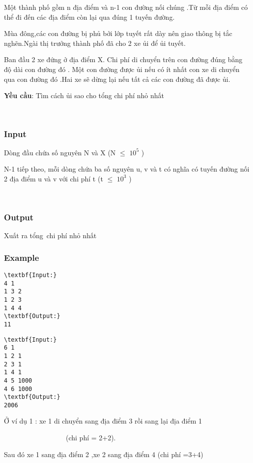 

Một thành phố gồm n địa điểm và n-1 con đường nối chúng .Từ mỗi địa điểm có thể đi đến các địa điểm còn lại qua đúng 1 tuyến đường.


Mùa đông,các con đường bị phủ bởi lớp tuyết rất dày nên giao thông bị tắc nghẽn.Ngài thị trưởng thành phố đã cho 2 xe ủi để ủi tuyết.


Ban đầu 2 xe đứng ở địa điểm X. Chi phí di chuyển trên con đường đúng bằng độ dài con đường đó . Một con đường được ủi nếu có ít nhất con xe di chuyển qua con đường đó .Hai xe sẽ dừng lại nếu tất cả các con đường đã được ủi.




\textbf{Yều cầu}: Tìm cách ủi sao cho tổng chi phí nhỏ nhất


 

\subsubsection{Input}

Dòng đầu chứa số nguyên N và X (N  $\le$  $10^{5}$ )


N-1 tiếp theo, mỗi dòng chứa ba số nguyên u, v và t có nghĩa có tuyến đường nối 2 địa điểm u và v với chi phí t (t  $\le$  $10^{3}$ )


 

\subsubsection{Output}

Xuất ra tổng chi phí nhỏ nhất

\subsubsection{Example}
\begin{verbatim}
\textbf{Input:} 
4 1
1 3 2
1 2 3
1 4 4
\textbf{Output:}
11
\end{verbatim}
\begin{verbatim}
\textbf{Input:} 
6 1
1 2 1
2 3 1
1 4 1
4 5 1000
4 6 1000
\textbf{Output:}
2006\end{verbatim}







Ở ví dụ 1 : xe 1 di chuyển sang địa điểm 3 rồi sang lại địa điểm 1


                  (chi phí = 2+2).


Sau đó xe 1 sang địa điểm 2 ,xe 2 sang địa điểm 4 (chi phí =3+4)


